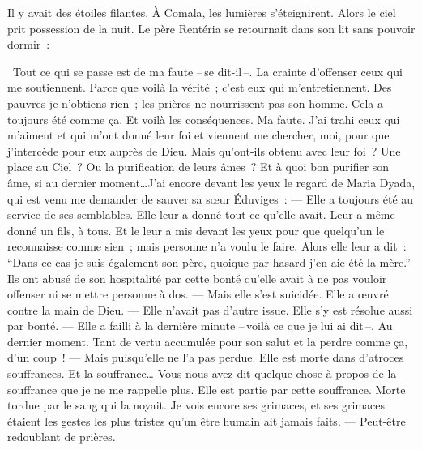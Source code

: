   Il y avait des étoiles filantes. À Comala, les lumières s'éteignirent.
\pend
%
\pstart
  Alors le ciel prit possession de la nuit.
\pend
%
\pstart
  Le père Rentéria se retournait dans son lit sans pouvoir dormir :

  \og{} Tout ce qui se passe est de ma faute --\,se dit-il\,--. La crainte d’offenser ceux qui me soutiennent. Parce que voilà la vérité ; c'est eux qui m’entretiennent. Des pauvres je n’obtiens rien ; les prières ne nourrissent pas son homme. Cela a toujours été comme ça. Et voilà les conséquences. Ma faute. J’ai trahi ceux qui m’aiment et qui m’ont donné leur foi et viennent me chercher, moi, pour que j’intercède pour eux auprès de Dieu. Mais qu’ont-ils obtenu avec leur foi ? Une place au Ciel ? Ou la purification de leurs âmes ? Et à quoi bon purifier son âme, si au dernier moment\ldots J’ai encore devant les yeux le regard de Maria Dyada, qui est venu me demander de sauver sa sœur Éduviges :
\pend
%
\pstart
  \guillemotright --- Elle a toujours été au service de ses semblables. Elle leur a donné tout ce qu’elle avait. Leur a même donné un fils, à tous. Et le leur a mis devant les yeux pour que quelqu’un le reconnaisse comme sien ; mais personne n’a voulu le faire. Alors elle leur a dit : ``Dans ce cas je suis également son père, quoique par hasard j’en aie été la mère.'' Ils ont abusé de son hospitalité par cette bonté qu’elle avait à ne pas vouloir offenser ni se mettre personne à dos.
\pend
%
\pstart
  \guillemotright --- Mais elle s’est suicidée. Elle a œuvré contre la main de Dieu.
\pend
%
\pstart
  \guillemotright --- Elle n’avait pas d’autre issue. Elle s’y est résolue aussi par bonté.
\pend
%
\pstart
  \guillemotright --- Elle a failli à la dernière minute --\,voilà ce que je lui ai dit\,--. Au dernier moment. Tant de vertu accumulée pour son salut et la perdre comme ça, d'un coup !
\pend
%
\pstart
  \guillemotright --- Mais puisqu’elle ne l’a pas perdue. Elle est morte dans d’atroces souffrances. Et la souffrance… Vous nous avez dit quelque-chose à propos de la souffrance que je ne me rappelle plus. Elle est partie par cette souffrance. Morte tordue par le sang qui la noyait. Je vois encore ses grimaces, et ses grimaces étaient les gestes les plus tristes qu’un être humain ait jamais faits.
\pend
%
\pstart
  \guillemotright --- Peut-être redoublant de prières.
